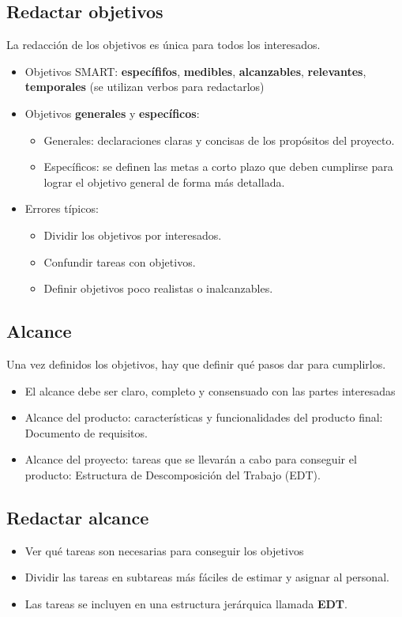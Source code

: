 \documentclass{article}
\begin{document}
\subsection{Redactar objetivos}
La redacción de los objetivos es única para todos los interesados.
\begin{itemize}
	\item Objetivos SMART: \textbf{específifos}, \textbf{medibles}, \textbf{alcanzables}, \textbf{relevantes}, \textbf{temporales} (se utilizan verbos para redactarlos)
	\item Objetivos \textbf{generales} y \textbf{específicos}:
	\begin{itemize}
		\item Generales: declaraciones claras y concisas de los propósitos del proyecto.
		\item Específicos: se definen las metas a corto plazo que deben cumplirse para lograr el objetivo general de forma más detallada.
	\end{itemize}
	\item Errores típicos:
	\begin{itemize}
		\item Dividir los objetivos por interesados.
		\item Confundir tareas con objetivos.
		\item Definir objetivos poco realistas o inalcanzables.
	\end{itemize}
\end{itemize}

\subsection{Alcance}

Una vez definidos los objetivos, hay que definir qué pasos dar para cumplirlos.
\begin{itemize}
	\item El alcance debe ser claro, completo y consensuado con las partes interesadas
	\item Alcance del producto: características y funcionalidades del producto final: Documento de requisitos.
	\item Alcance del proyecto: tareas que se llevarán a cabo para conseguir el producto: Estructura de Descomposición del Trabajo (EDT).
\end{itemize}

\subsection{Redactar alcance}
\begin{itemize}
	\item Ver qué tareas son necesarias para conseguir los objetivos
	\item Dividir las tareas en subtareas más fáciles de estimar y asignar al personal.
	\item Las tareas se incluyen en una estructura jerárquica llamada \textbf{EDT}.
\end{itemize}
\end{document}
